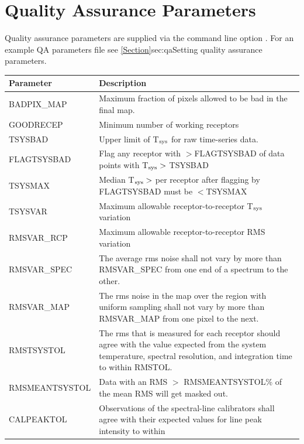 \documentclass[11pt,oneside,chapters]{starlink}
\begin{document}
\newpage
\chapter{Quality Assurance Parameters}
\label{app:qa}
Quality assurance parameters are supplied via the command line option
. For an example QA parameters file see
\cref{Section}{sec:qa}{Setting quality assurance parameters}.
\begin{table}[h!]
\begin{tabular}{|p{4.0cm}|p{11.0cm}|}
\hline
\textbf{Parameter} & \textbf{Description} \\
\hline
BADPIX\_MAP    & Maximum fraction of pixels allowed to be bad in the final map. \\
GOODRECEP      & Minimum number of working receptors \\
TSYSBAD        & Upper limit of T$_{\textnormal{sys}}$ for raw time-series data.\\
FLAGTSYSBAD    & Flag any receptor with $>$FLAGTSYSBAD of data points with
                 T$_{\textnormal{sys}}>$ TSYSBAD \\
TSYSMAX        & Median T$_{\textnormal{sys}}>$ per receptor after flagging by FLAGTSYSBAD
                 must be $<$TSYSMAX \\
TSYSVAR        & Maximum allowable receptor-to-receptor T$_{\textnormal{sys}}$ variation \\
RMSVAR\_RCP    & Maximum allowable receptor-to-receptor RMS variation \\
RMSVAR\_SPEC   & The average rms noise shall not vary by more than RMSVAR\_SPEC
                 from one end of a spectrum to the other. \\
RMSVAR\_MAP    & The rms noise in the map over the region with uniform sampling
                 shall not vary by more than RMSVAR\_MAP from one pixel to the
                 next. \\
RMSTSYSTOL     & The rms that is measured for each receptor should agree with the
                 value expected from the system temperature, spectral resolution,
                 and integration time to within RMSTOL. \\
RMSMEANTSYSTOL & Data with an RMS $>$ RMSMEANTSYSTOL\% of the mean RMS will get
                 masked out. \\
CALPEAKTOL     & Observations of the spectral-line calibrators shall agree with
                 their expected values for line peak intensity to within

\end{tabular}
\end{table}
\end{document}
